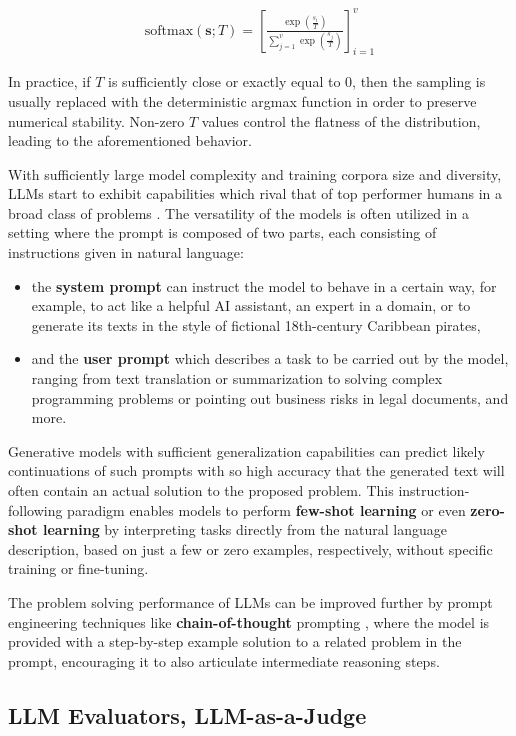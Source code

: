 \documentclass[noindent,nohyp,parspace,titlepage,twoside,12pt]{article}
\begin{document}
      \begin{align} \label{eqsoftmax}
        \text{softmax}(\mathbf{s};T)
          = \left[
              \frac{\exp(\frac{s_i}{T})}{\sum_{j=1}^v \exp(\frac{s_j}{T})}
            \right]_{i=1}^v
      \end{align}

      In practice, if $T$ is sufficiently close or exactly equal to $0$, then
      the sampling is usually replaced with the deterministic argmax function
      in order to preserve numerical stability. Non-zero $T$ values control
      the flatness of the distribution, leading to the aforementioned behavior.

      With sufficiently large model complexity and training corpora size and
      diversity, LLMs start to exhibit capabilities which rival that of top
      performer humans in a broad class of problems \cite{gpt3,gpt4}. The
      versatility of the models is often utilized in a setting where the prompt
      is composed of two parts, each consisting of instructions given in
      natural language:

      \begin{itemize}
        \item the \textbf{system prompt} can instruct the model to behave in a
              certain way, for example, to act like a helpful AI assistant,
              an expert in a domain, or to generate its texts in the style of
              fictional 18th-century Caribbean pirates,

        \item and the \textbf{user prompt} which describes a task to be carried
              out by the model, ranging from text translation or summarization
              to solving complex programming problems or pointing out business
              risks in legal documents, and more.
      \end{itemize}

      Generative models with sufficient generalization capabilities can predict
      likely continuations of such prompts with so high accuracy that the
      generated text will often contain an actual solution to the proposed
      problem. This instruction-following paradigm enables models to perform
      \textbf{few-shot learning} \cite{gpt3} or even \textbf{zero-shot learning}
      by interpreting tasks directly from the natural language description,
      based on just a few or zero examples, respectively, without specific
      training or fine-tuning.

      The problem solving performance of LLMs can be improved further by
      prompt engineering techniques like \textbf{chain-of-thought} prompting
      \cite{cot}, where the model is provided with a step-by-step example
      solution to a related problem in the prompt, encouraging it to also
      articulate intermediate reasoning steps.

    \subsection{LLM Evaluators, LLM-as-a-Judge}

\newpage

  \nocite{*}
  \printbibliography[heading=bibintoc]
\end{document}

